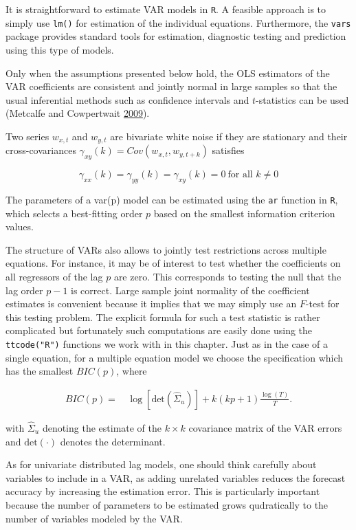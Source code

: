 \documentclass[
  12pt,
]{article}
\begin{document}
It is straightforward to estimate VAR models in \texttt{R}. A feasible approach is to simply use \texttt{lm()} for estimation of the individual equations. Furthermore, the \texttt{vars} package provides standard tools for estimation, diagnostic testing and prediction using this type of models.

Only when the assumptions presented below hold, the OLS estimators of the VAR coefficients are consistent and jointly normal in large samples so that the usual inferential methods such as confidence intervals and \(t\)-statistics can be used (Metcalfe and Cowpertwait \protect\hyperlink{ref-metcalfe2009introductory}{2009}).

Two series \(w_{x,t}\) and \(w_{y,t}\) are bivariate white noise if they are stationary and their cross-covariances \(\gamma_{xy}(k) = Cov(w_{x,t}, w_{y, t+k})\) satisfies

\[
\gamma_{xx}(k) = \gamma_{yy}(k) = \gamma_{xy}(k) = 0\ \text{for all } k \neq 0
\]

The parameters of a var(p) model can be estimated using the \texttt{ar} function in \texttt{R}, which selects a best-fitting order \(p\) based on the smallest information criterion values.

The structure of VARs also allows to jointly test restrictions across multiple equations. For instance, it may be of interest to test whether the coefficients on all regressors of the lag \(p\) are zero. This corresponds to testing the null that the lag order \(p-1\) is correct. Large sample joint normality of the coefficient estimates is convenient because it implies that we may simply use an \(F\)-test for this testing problem. The explicit formula for such a test statistic is rather complicated but fortunately such computations are easily done using the \texttt{ttcode("R")} functions we work with in this chapter. Just as in the case of a single equation, for a multiple equation model we choose the specification which has the smallest \(BIC(p)\), where

\[
\begin{aligned}
  BIC(p) =& \, \log\left[\text{det}(\widehat{\Sigma}_u)\right] + k(kp+1) \frac{\log(T)}{T}.
\end{aligned}
\]

with \(\widehat{\Sigma}_u\) denoting the estimate of the \(k \times k\) covariance matrix of the VAR errors and \(\text{det}(\cdot)\) denotes the determinant.

As for univariate distributed lag models, one should think carefully about variables to include in a VAR, as adding unrelated variables reduces the forecast accuracy by increasing the estimation error. This is particularly important because the number of parameters to be estimated grows qudratically to the number of variables modeled by the VAR.
\end{document}
